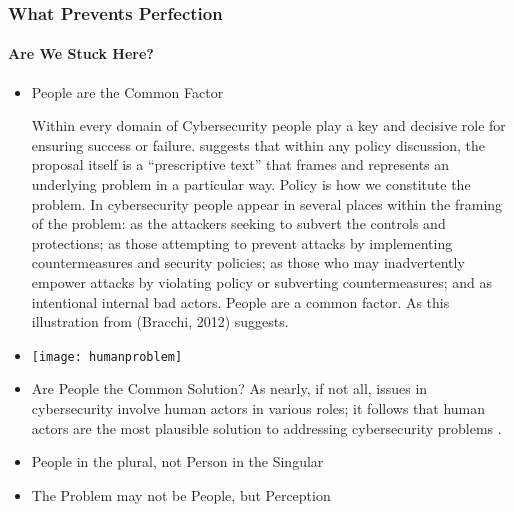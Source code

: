 \begin{frame}
  \frametitle{What Prevents Perfection}
  \framesubtitle{Are We Stuck Here?}
  \begin{itemize}
    \item  People are the Common Factor

           {\scriptsize{Within every domain of Cybersecurity people play a key and decisive role for ensuring success or failure. \textcite{bacchiWhyStudyProblematizations2012} suggests that within any policy discussion, the proposal itself is a ``prescriptive text'' that frames and represents an underlying problem in a particular way. Policy is how we constitute the problem. In cybersecurity people appear in several places within the framing of the problem: as the attackers seeking to subvert the controls and protections; as those attempting to prevent attacks by implementing countermeasures and security policies; as those who may inadvertently empower attacks by violating policy or subverting countermeasures; and as intentional internal bad actors. People are a common factor. As this illustration from (Bracchi, 2012) suggests.  }}

 \item[] \texttt{[image: humanproblem]}

    \item<2-> Are People the Common Solution?
           {\scriptsize{As nearly, if not all, issues in cybersecurity involve human actors in various roles; it follows that human actors are the most plausible solution to addressing cybersecurity problems \parencite{zimmermannMovingHumanasproblemHumanassolution2019}.}}


    \item<3-> People in the plural, not Person in the Singular

    \item<4-> The Problem may not be People, but Perception



  \end{itemize}
\end{frame}
